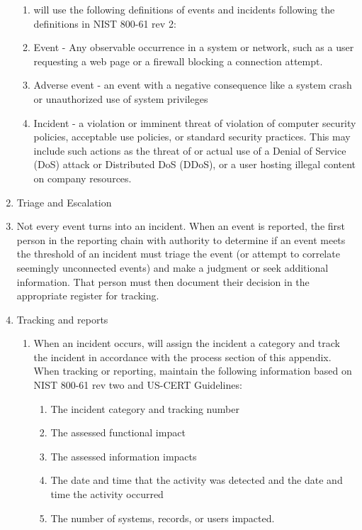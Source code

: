 \documentclass[../main.tex]{subfiles}
\begin{document}
\begin{enumerate}
    \begin{enumerate}
        \item \CompanyName{}  will use the following definitions of events and incidents following the definitions in NIST 800-61 rev 2:
        \item Event - Any observable occurrence in a system or network, such as a user requesting a web page or a firewall blocking a connection attempt.
        \item Adverse event - an event with a negative consequence like a system crash or unauthorized use of system privileges
        \item Incident - a violation or imminent threat of violation of computer security policies, acceptable use policies, or standard security practices.
        This may include such actions as the threat of or actual use of a Denial of Service (DoS) attack or Distributed DoS (DDoS), or a user hosting illegal content on company resources.
    \end{enumerate}
    \item Triage and Escalation
    \item Not every event turns into an incident. When an event is reported, the first person in the reporting chain with authority to determine if an event meets the threshold of an
    incident must triage the event (or attempt to correlate seemingly unconnected events) and make a judgment or seek additional information. That person must then document their decision
    in the appropriate register for tracking.
    \item Tracking and reports
    \begin{enumerate}
        \item When an incident occurs, \CompanyName{}  will assign the incident a category and track the incident in accordance with the process section of this
        appendix. When tracking or reporting, maintain the following information based on NIST 800-61 rev two and US-CERT Guidelines:
        \begin{enumerate}
            \item The incident category and tracking number
            \item The assessed functional impact
            \item The assessed information impacts
            \item The date and time that the activity was detected and the date and time the activity occurred
            \item The number of systems, records, or users impacted.

\end{enumerate}
\end{enumerate}
\end{enumerate}
\end{document}
